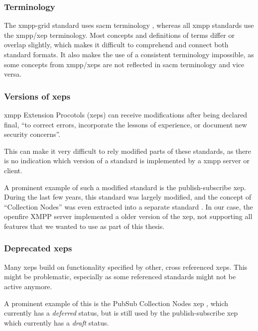\subsubsection{Terminology}

The \gls{xmpp-grid} standard uses \gls{sacm} terminology \cite{ietf-sacm-terminology-14}, whereas all \gls{xmpp} standards use the \gls{xmpp}/\gls{xep} terminology.
Most concepts and definitions of terms differ or overlap slightly, which makes it difficult to comprehend and connect both standard formats.
It also makes the use of a consistent terminology impossible, as some concepts from \gls{xmpp}/\glspl{xep} are not reflected in \gls{sacm} terminology and vice versa.

\subsubsection{Versions of \glspl{xep}}
\gls{xmpp} Extension Procotols (\glspl{xep}) can receive modifications after being declared final, 
``to correct errors, incorporate the lessons of experience, or document new security concerns''. \cite{xep-0001}

This can make it very difficult to rely modified parts of these standards, as there is no indication which version of a standard is implemented by a \gls{xmpp} server or client.

A prominent example of such a modified standard is the \gls{publish-subscribe} \gls{xep}.
During the last few years, this standard was largely modified,
and the concept of ``Collection Nodes'' was even extracted into a separate standard \cite{xep-0248}.
In our case, the openfire XMPP server implemented a older version of the \gls{xep},
not supporting all features that we wanted to use as part of this thesis.

\subsubsection{Deprecated \glspl{xep}}

Many \glspl{xep} build on functionality specified by other, cross referenced \glspl{xep}.
This might be problematic, especially as some referenced standards might not be active anymore.

A prominent example of this is the PubSub Collection Nodes \gls{xep} \cite{xep-0248}, which currently has a \emph{deferred} status, but is still used by the \gls{publish-subscribe} \gls{xep} \cite{xep-0060} which currently has a \emph{draft} status.

